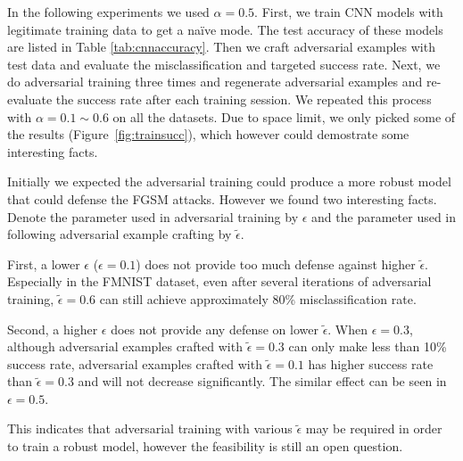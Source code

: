 \documentclass{article}
\begin{document}
In the following experiments we used $\alpha=0.5$. First, we train CNN models with legitimate training data to get a na\"ive mode.
The test accuracy of these models are listed in Table \ref{tab:cnnaccuracy}.
Then we craft adversarial examples with test data and evaluate the misclassification and targeted success rate.
Next, we do adversarial training three times and regenerate adversarial examples and re-evaluate the success rate after each training session.
We repeated this process with $\alpha=0.1\sim 0.6$ on all the datasets.
Due to space limit, we only picked some of the results (Figure~\ref{fig:trainsucc}), which however could demostrate some interesting facts.

Initially we expected the adversarial training could produce a more robust model that could defense the FGSM attacks. However we found two interesting facts.
Denote the parameter used in adversarial training by $\epsilon$ and the parameter used in following adversarial example crafting by $\tilde{\epsilon}$.

First, a lower $\epsilon$ ($\epsilon = 0.1$) does not provide too much defense against higher $\tilde{\epsilon}$. Especially in the FMNIST dataset, 
even after several iterations of adversarial training, $\tilde{\epsilon}=0.6$ can still achieve approximately 80\% misclassification rate.

Second, a higher $\epsilon$ does not provide any defense on lower $\tilde{\epsilon}$. When $\epsilon=0.3$, although adversarial examples crafted with $\tilde{\epsilon}=0.3$
can only make less than 10\% success rate, adversarial examples crafted with $\tilde{\epsilon}=0.1$ has higher success rate than $\tilde{\epsilon}=0.3$ and will not decrease
significantly. The similar effect can be seen in $\epsilon=0.5$.

This indicates that adversarial training with various $\tilde{\epsilon}$ may be required in order to train a robust model, however the feasibility is still an open question.
\end{document}
